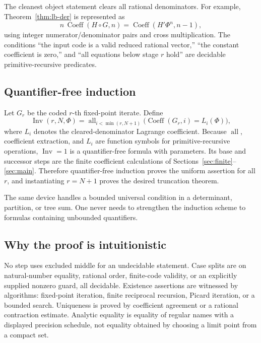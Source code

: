 \documentclass[11pt]{article}
\theoremstyle{definition}
\begin{document}
The cleanest object statement clears all rational denominators.  For example,
Theorem~\ref{thm:lb-der} is represented as
\[
 n\,\operatorname{Coeff}(H\circ G,n)
 =\operatorname{Coeff}(H'\Phi^n,n-1),
\]
using integer numerator/denominator pairs and cross multiplication.  The
conditions ``the input code is a valid reduced rational vector,'' ``the
constant coefficient is zero,'' and ``all equations below stage \(r\) hold''
are decidable primitive-recursive predicates.

\subsection{Quantifier-free induction}

Let \(G_r\) be the coded \(r\)-th fixed-point iterate.  Define
\[
 \operatorname{Inv}(r,N,\Phi)
 =\operatorname{all}_{i<\min(r,N+1)}
   \bigl(\operatorname{Coeff}(G_r,i)=L_i(\Phi)\bigr),
\]
where \(L_i\) denotes the cleared-denominator Lagrange coefficient.  Because
\(\operatorname{all}\), coefficient extraction, and \(L_i\) are function
symbols for primitive-recursive operations, \(\operatorname{Inv}=1\) is a
quantifier-free formula with parameters.  Its base and successor steps are the
finite coefficient calculations of Sections~\ref{sec:finite}--\ref{sec:main}.
Therefore quantifier-free induction proves the uniform assertion for all
\(r\), and instantiating \(r=N+1\) proves the desired truncation theorem.

The same device handles a bounded universal condition in a determinant,
partition, or tree sum.  One never needs to strengthen the induction scheme to
formulas containing unbounded quantifiers.

\subsection{Why the proof is intuitionistic}

No step uses excluded middle for an undecidable statement.  Case splits are on
natural-number equality, rational order, finite-code validity, or an explicitly
supplied nonzero guard, all decidable.  Existence assertions are witnessed by
algorithms: fixed-point iteration, finite reciprocal recursion, Picard
iteration, or a bounded search.  Uniqueness is proved by coefficient agreement
or a rational contraction estimate.  Analytic equality is equality of regular
names with a displayed precision schedule, not equality obtained by choosing a
limit point from a compact set.
\end{document}
